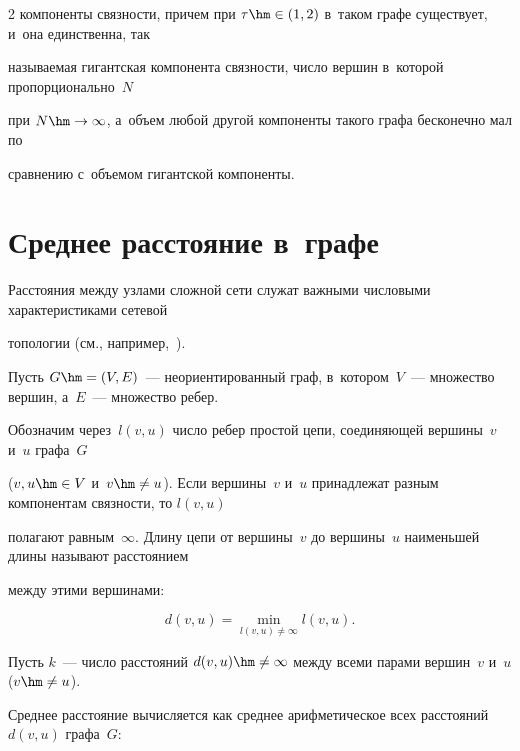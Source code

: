 \begin{multicols}{2}
компоненты связности, причем при $\tau\hm\in(1,2)$ в~таком графе существует, и~она единственна, так

называемая гигантская компонента связ\-ности, чис\-ло вершин в~которой пропорционально~$N$

при $N\hm\rightarrow\infty$, а~объем любой другой компоненты такого графа бесконечно мал по

сравнению с~объемом гигантской компоненты.





\vspace*{-6pt}



\section{Среднее расстояние в~графе}



\vspace*{-2pt}



Расстояния между узлами сложной сети служат важными числовыми характеристиками сетевой

топологии (см., например,~\cite{Hof2, Chu}).

Пусть $G \hm= (V,E)$~--- неориентированный граф, в~котором~$V$~--- множество вершин, а~$E$~--- множество ребер.

Обозначим через~$l(v,u)$ чис\-ло ребер простой цепи, со\-еди\-ня\-ющей вершины~$v$ и~$u$ графа~$G$

($v,u\hm\in V$ и~$v\hm\neq u$). Если вершины~$v$ и~$u$ принадлежат разным компонентам связ\-ности, то $l(v,u)$

полагают равным~$\infty$. Длину цепи от вершины~$v$ до вершины~$u$ наименьшей длины называют расстоянием

между этими вершинами:

$$

d(v,u)=\min\limits_{l(v,u)\neq\infty}l(v,u).

$$



Пусть $k$~--- чис\-ло рас\-сто\-яний $d(v,u)\hm\neq\infty$ между всеми парами вершин~$v$ и~$u$ ($v\hm\neq u$).

Среднее расстояние вы\-чис\-ля\-ет\-ся как среднее арифметическое всех рас\-сто\-яний $d(v,u)$ графа~$G$:

\begin{equation*}


\end{equation*}
\end{multicols}
